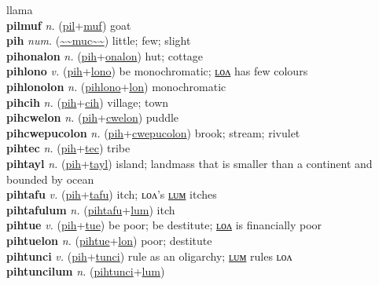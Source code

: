 llama \label{pilut} \\
\textbf{pilmuf} \textit{n.} (\hyperref[pil]{pil}+\hyperref[muf]{muf})
goat \label{pilmuf} \\
\textbf{pih} \textit{num.} (\hyperref[muc]{\~{}\~{}muc\~{}\~{}})
little; few; slight \label{pih} \\
\textbf{pihonalon} \textit{n.} (\hyperref[pih]{pih}+\hyperref[onalon]{onalon})
hut; cottage \label{pihonalon} \\
\textbf{pihlono} \textit{v.} (\hyperref[pih]{pih}+\hyperref[lono]{lono})
be monochromatic; \hyperref[pihlonolon]{ʟᴏᴧ} has few colours \label{pihlono} \\
\textbf{pihlonolon} \textit{n.} (\hyperref[pihlono]{pihlono}+\hyperref[lon]{lon})
monochromatic \label{pihlonolon} \\
\textbf{pihcih} \textit{n.} (\hyperref[pih]{pih}+\hyperref[cih]{cih})
village; town \label{pihcih} \\
\textbf{pihcwelon} \textit{n.} (\hyperref[pih]{pih}+\hyperref[cwelon]{cwelon})
puddle \label{pihcwelon} \\
\textbf{pihcwepucolon} \textit{n.} (\hyperref[pih]{pih}+\hyperref[cwepucolon]{cwepucolon})
brook; stream; rivulet \label{pihcwepucolon} \\
\textbf{pihtec} \textit{n.} (\hyperref[pih]{pih}+\hyperref[tec]{tec})
tribe \label{pihtec} \\
\textbf{pihtayl} \textit{n.} (\hyperref[pih]{pih}+\hyperref[tayl]{tayl})
island; landmass that is smaller than a continent and bounded by ocean \label{pihtayl} \\
\textbf{pihtafu} \textit{v.} (\hyperref[pih]{pih}+\hyperref[tafu]{tafu})
itch; ʟᴏᴧ's \hyperref[pihtafulum]{ʟᴜᴍ} itches \label{pihtafu} \\
\textbf{pihtafulum} \textit{n.} (\hyperref[pihtafu]{pihtafu}+\hyperref[lum]{lum})
itch \label{pihtafulum} \\
\textbf{pihtue} \textit{v.} (\hyperref[pih]{pih}+\hyperref[tue]{tue})
be poor; be destitute; \hyperref[pihtuelon]{ʟᴏᴧ} is financially poor \label{pihtue} \\
\textbf{pihtuelon} \textit{n.} (\hyperref[pihtue]{pihtue}+\hyperref[lon]{lon})
poor; destitute \label{pihtuelon} \\
\textbf{pihtunci} \textit{v.} (\hyperref[pih]{pih}+\hyperref[tunci]{tunci})
rule as an oligarchy; \hyperref[pihtuncilum]{ʟᴜᴍ} rules ʟᴏᴧ \label{pihtunci} \\
\textbf{pihtuncilum} \textit{n.} (\hyperref[pihtunci]{pihtunci}+\hyperref[lum]{lum})
